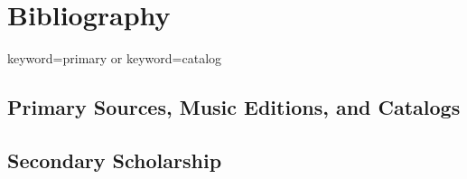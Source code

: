 \chapter{Bibliography}
\label{ch:biblio}

  {keyword=primary or keyword=catalog}

\section*{Primary Sources, Music Editions, and Catalogs}
\printbibliography[heading=none, filter=primary]

\section*{Secondary Scholarship}
\printbibliography[heading=none, filter=secondary]

\endinput



